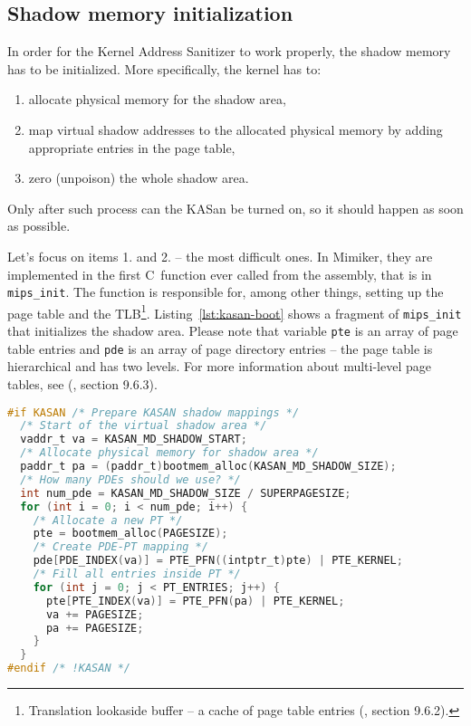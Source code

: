 \documentclass[shortabstract, manyadvisors, english, mgr]{iithesis}
\theoremstyle{definition} \newtheorem*{definition}{Definicja}
\theoremstyle{definition} \newtheorem*{example}{Przykład}
\theoremstyle{definition} \newtheorem*{remark}{Uwaga}
\begin{document}
\subsection{Shadow memory initialization}

In order for the Kernel Address Sanitizer to work properly, the shadow memory has to be initialized. More specifically, the kernel has to:
\begin{enumerate}
    \item allocate physical memory for the shadow area,
    \item map virtual shadow addresses to the allocated physical memory by adding appropriate entries in the page table,
    \item zero (unpoison) the whole shadow area.
\end{enumerate}

Only after such process can the KASan be turned on, so it should happen as soon as possible.

Let's focus on items 1. and 2. -- the most difficult ones. In Mimiker, they are implemented in the first C~function ever called from the assembly, that is in \texttt{mips\_init}. The function is responsible for, among other things, setting up the page table and the TLB\footnote{Translation lookaside buffer -- a cache of page table entries (\cite{bib:csapp}, section 9.6.2).}. Listing~\ref{lst:kasan-boot} shows a fragment of \texttt{mips\_init} that initializes the shadow area. Please note that variable \texttt{pte} is an array of page table entries and \texttt{pde} is an array of page directory entries -- the page table is hierarchical and has two levels. For more information about multi-level page tables, see (\cite{bib:csapp}, section 9.6.3).

\begin{lstlisting}[language=C, caption={A fragment of \texttt{mips\_init} function, from file \texttt{sys/mips/boot.c}, that initializes the shadow memory (with additional comments).}, label={lst:kasan-boot}]
#if KASAN /* Prepare KASAN shadow mappings */
  /* Start of the virtual shadow area */
  vaddr_t va = KASAN_MD_SHADOW_START;
  /* Allocate physical memory for shadow area */
  paddr_t pa = (paddr_t)bootmem_alloc(KASAN_MD_SHADOW_SIZE);
  /* How many PDEs should we use? */
  int num_pde = KASAN_MD_SHADOW_SIZE / SUPERPAGESIZE;
  for (int i = 0; i < num_pde; i++) {
    /* Allocate a new PT */
    pte = bootmem_alloc(PAGESIZE);
    /* Create PDE-PT mapping */
    pde[PDE_INDEX(va)] = PTE_PFN((intptr_t)pte) | PTE_KERNEL;
    /* Fill all entries inside PT */
    for (int j = 0; j < PT_ENTRIES; j++) {
      pte[PTE_INDEX(va)] = PTE_PFN(pa) | PTE_KERNEL;
      va += PAGESIZE;
      pa += PAGESIZE;
    }
  }
#endif /* !KASAN */
\end{lstlisting}
\end{document}
